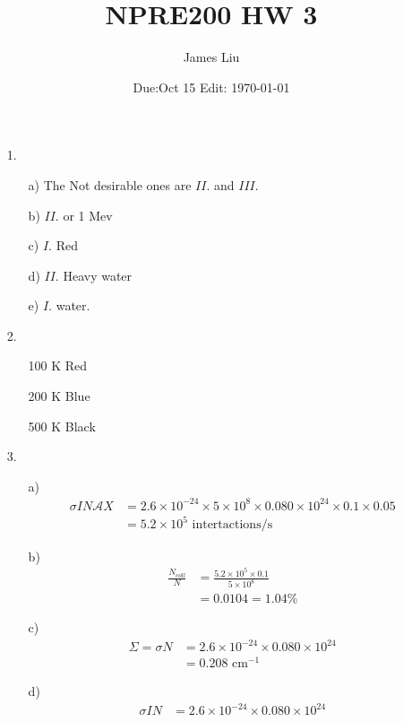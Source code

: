 \documentclass{article}
\date{Due:Oct 15 Edit: \today}
\title{NPRE200 HW 3}
\author{James Liu}
\begin{document}
\maketitle
\begin{itemize}
    \item [1.] 
    \begin{itemize}
        \item [a)] The Not desirable ones are \(II.\) and \(III.\)
        \item [b)] \(II.\) or 1 Mev
        \item [c)] \(I.\) Red
        \item [d)] \(II.\) Heavy water
        \item [e)] \(I.\) water.
    \end{itemize}
    \item [2.] \
    \begin{itemize}
        \item [100 K] Red
        \item [200 K] Blue
        \item [500 K] Black
    \end{itemize}
    \item [3.]
    \begin{itemize}
        \item [a)]
        \begin{align*}
            \sigma I N \mathcal{A} X &= 2.6\times 10^{-24}\times 5\times 10^8\times 0.080\times 10^{24}\times 0.1\times 0.05
            \\ &=5.2\times 10^5 \text{ intertactions/s}
        \end{align*}
        \item [b)]
        \begin{align*}
            \frac{N_{coll}}{N}&=\frac{5.2\times 10^5\times 0.1}{5\times 10^8}\\
            &=0.0104 = 1.04\%
        \end{align*}
        \item [c)]
        \begin{align*}
            \Sigma = \sigma N &=2.6\times 10^{-24}\times 0.080\times 10^{24}\\
            &=0.208 \text{ cm}^{-1}
        \end{align*}
        \item [d)] 
        \begin{align*}
            \sigma I N & = 2.6\times 10^{-24}\times 0.080\times 10^{24}\\

\end{align*}
\end{itemize}
\end{itemize}
\end{document}
